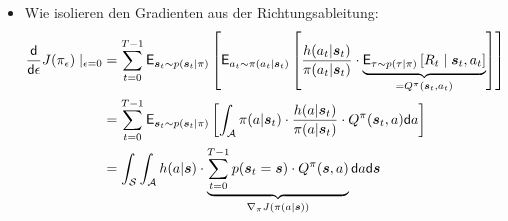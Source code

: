 \documentclass[a4paper, 12pt]{scrartcl}
\begin{document}
\begin{beweis}
\begin{itemize}
\begin{align*}
            \right]
            =
            \int_{\mathcal{A}} 
            \underbrace{
                \pi(a|\bm{s}_t) \cdot \frac{h(a|\bm{s}_t)}{\pi(a|\bm{s}_t)}
            }_{
                = h(a|\bm{s}_t)
            }
            \mathsf{d}a
            = 0
            \\
            \Rightarrow & \mathsf{E}_{a_t \sim \pi(a_t|\bm{s}_t)}
            \left[
                \frac{h(a_t|\bm{s}_t)}{\pi(a_t|\bm{s}_t)} \cdot 
                \underbrace{
                    \mathsf{E}_{\tau \sim p(\tau|\pi)}
                    \left[
                        R_{\text{past}}(t)  
                        \mid \bm{s}_t
                    \right]
                }_{
                    \text{unabhängig von } a_t
                }
            \right]
            =
            \mathsf{E}_{\tau \sim p(\tau|\pi)}
                \left[
                    R_{\text{past}}(t)  
                    \mid \bm{s}_t
                \right]
            \cdot 
            \mathsf{E}_{a_t \sim \pi(a_t|\bm{s}_t)}
            \left[
                \frac{h(a_t|\bm{s}_t)}{\pi(a_t|\bm{s}_t)} 
            \right]
            = 0
        \end{align*}
        \item Wie isolieren den Gradienten aus der Richtungsableitung:
        \begin{align*}
            \frac{\mathsf{d}}{\mathsf{d} \epsilon} J(\pi_\epsilon) \mid_{\epsilon=0}
            &=
            \sum_{t=0}^{T-1}
            \mathsf{E}_{\bm{s}_t \sim p(\bm{s}_t|\pi)}  
            \left[
                \mathsf{E}_{a_t \sim \pi(a_t|\bm{s}_t)}
                \left[
                    \vphantom{\int}
                    \frac{h(a_t|\bm{s}_t)}{\pi(a_t|\bm{s}_t)} \cdot
                    \underbrace{
                        \mathsf{E}_{\tau \sim p(\tau|\pi)}
                        \left[
                            R_{t}  \mid \bm{s}_t , a_t
                        \right]
                    }_{
                        = Q^{\pi}(\bm{s}_t , a_t)
                    }
                \right]
            \right]
            \\
            &=
            \sum_{t=0}^{T-1}
            \mathsf{E}_{\bm{s}_t \sim p(\bm{s}_t|\pi)}  
            \left[
                \int_{\mathcal{A}}
                \pi(a|\bm{s}_t) \cdot
                \frac{h(a|\bm{s}_t)}{\pi(a|\bm{s}_t)} \cdot
                Q^{\pi}(\bm{s}_t , a)
                \mathsf{d}a
            \right]
            \\
            &=
            \int_{\mathcal{S}}
            \int_{\mathcal{A}}
            h(a|\bm{s}) \cdot
            \underbrace{
                \sum_{t=0}^{T-1}
                p(\bm{s}_t = \bm{s}) \cdot Q^{\pi}(\bm{s},a)
            }_{
                \nabla_{\pi} J(\pi(a | \bm{s}))
            }
            \mathsf{d}a
            \mathsf{d}\bm{s}
        \end{align*}


\end{itemize}
\end{beweis}
\end{document}
